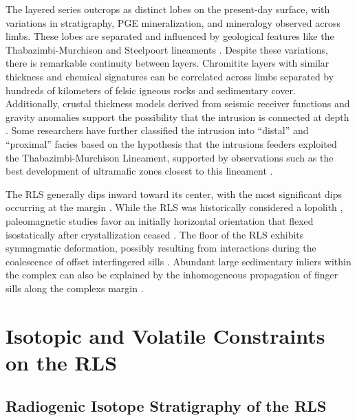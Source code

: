 The layered series outcrops as distinct lobes on the present-day
surface, with variations in stratigraphy, PGE mineralization, and
mineralogy observed across limbs. These lobes are separated and
influenced by geological features like the Thabazimbi-Murchison and
Steelpoort lineaments \citep{duplessis1990,ashwal2005,mcdonald2005,scoon1994}. Despite these
variations, there is remarkable continuity between layers. Chromitite
layers with similar thickness and chemical signatures can be correlated
across limbs separated by hundreds of kilometers of felsic igneous rocks
and sedimentary cover. Additionally, crustal thickness models derived
from seismic receiver functions and gravity anomalies support the
possibility that the intrusion is connected at depth \citep{webb2004,cawthorn2001}. Some researchers have further classified
the intrusion into ``distal'' and ``proximal'' facies based on the
hypothesis that the intrusion\textquotesingle s feeders exploited the
Thabazimbi-Murchison Lineament, supported by observations such as the
best development of ultramafic zones closest to this lineament \citep{scoon1994,clarke2000}.

The RLS generally dips inward toward its center, with the most
significant dips occurring at the margin \citep{button1976,frick1967}.
While the RLS was historically considered a lopolith \citep{wilson1956},
paleomagnetic studies favor an initially horizontal orientation that
flexed isostatically after crystallization ceased \citep{hattingh1986}. The
floor of the RLS exhibits synmagmatic deformation, possibly resulting
from interactions during the coalescence of offset interfingered sills
\citep{pollard1975,clarke2009}. Abundant large sedimentary
inliers within the complex can also be explained by the inhomogeneous
propagation of finger sills along the complex\textquotesingle s margin
\citep{clarke2000,clarke2009}.

\section{Isotopic and Volatile Constraints on the RLS}
\label{sec:appB-isotopic-volatile-constraints}

\subsection{Radiogenic Isotope Stratigraphy of the RLS}
\label{sec:ch5-radiogenic-isotope-stratigraphy-of-the-rls}


